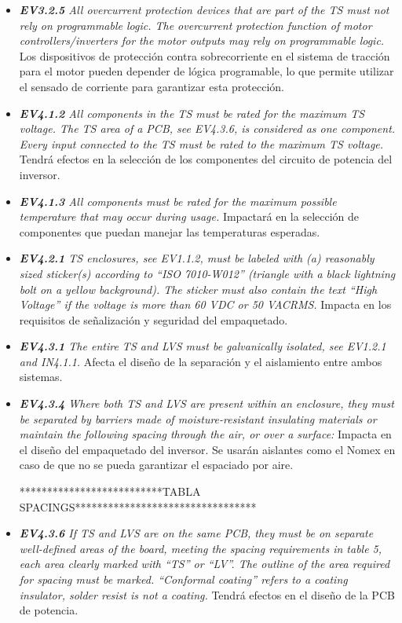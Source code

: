 \begin{itemize}
    \item \textit{\textbf{EV3.2.5} All overcurrent protection devices that are part of the TS must not rely on programmable logic. The overcurrent protection function of motor controllers/inverters for the motor outputs may rely on programmable logic.} Los dispositivos de protección contra sobrecorriente en el sistema de tracción para el motor pueden depender de lógica programable, lo que permite utilizar el sensado de corriente para garantizar esta protección.
    \item \textit{\textbf{EV4.1.2} All components in the TS must be rated for the maximum TS voltage. The TS area of a PCB, see EV4.3.6, is considered as one component. Every input connected to the TS must be rated to the maximum TS voltage.} Tendrá efectos en la selección de los componentes del circuito de potencia del inversor.
    \item \textit{\textbf{EV4.1.3}  All components must be rated for the maximum possible temperature that may occur during usage.} Impactará en la selección de componentes que puedan manejar las temperaturas esperadas.
    \item \textit{\textbf{EV4.2.1} TS enclosures, see EV1.1.2, must be labeled with (a) reasonably sized sticker(s) according to “ISO 7010-W012” (triangle with a black lightning bolt on a yellow background). The sticker must also contain the text “High Voltage” if the voltage is more than 60 VDC or 50 VACRMS.} Impacta en los requisitos de señalización y seguridad del empaquetado.
    \item \textit{\textbf{EV4.3.1} The entire TS and LVS must be galvanically isolated, see EV1.2.1 and IN4.1.1.} Afecta el diseño de la separación y el aislamiento entre ambos sistemas.
    \item \textit{\textbf{EV4.3.4} Where both TS and LVS are present within an enclosure, they must be separated by barriers made of moisture-resistant insulating materials or maintain the following spacing through the air, or over a surface:} Impacta en el diseño del empaquetado del inversor.  Se usarán aislantes como el Nomex en caso de que no se pueda garantizar el espaciado por aire.

    **************************TABLA SPACINGS*********************************

    \item \textit{\textbf{EV4.3.6} If TS and LVS are on the same PCB, they must be on separate well-defined areas of the board, meeting the spacing requirements in table 5, each area clearly marked with “TS” or “LV”. The outline of the area required for spacing must  be marked. “Conformal coating” refers to a coating insulator, solder resist is not a coating.} Tendrá efectos en el diseño de la PCB de potencia.
    

\end{itemize}
